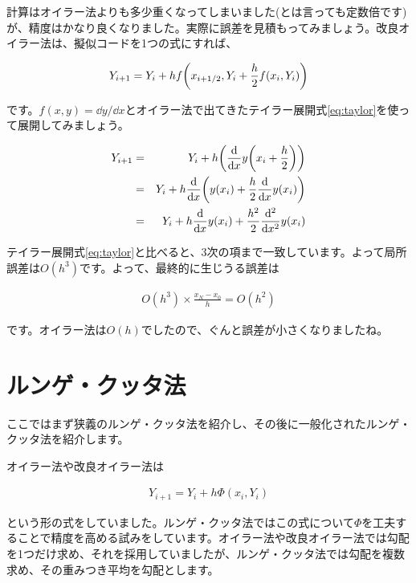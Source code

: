 計算はオイラー法よりも多少重くなってしまいました(とは言っても定数倍です)が、精度はかなり良くなりました。実際に誤差を見積もってみましょう。改良オイラー法は、擬似コードを1つの式にすれば、

\begin{eqnarray}
    Y_{i+1}=Y_i+hf\pqty{x_{i+1/2},Y_i+\frac{h}{2}f(x_i,Y_i)}
\end{eqnarray}

\noindent
です。$f(x,y)=\dd y/\dd x$とオイラー法で出てきたテイラー展開式\ref{eq:taylor}を使って展開してみましょう。

\begin{eqnarray}
    Y_{i+1}&=&Y_i+h\pqty{\frac{\dd}{\dd x}y\pqty{x_i+\frac{h}{2}}} \\
    &=&Y_i+h\frac{\dd}{\dd x}\pqty{y(x_i)+\frac{h}{2}\frac{\dd}{\dd x}y(x_i)} \nonumber \\
    &=&Y_i+h\frac{\dd}{\dd x}y(x_i)+\frac{h^2}{2}\frac{\dd^2}{\dd x^2}y(x_i) \setcounter{equation}{9}
\end{eqnarray}

テイラー展開式\ref{eq:taylor}と比べると、3次の項まで一致しています。よって局所誤差は$O(h^3)$です。よって、最終的に生じうる誤差は

\begin{eqnarray}
    O(h^3)\times \frac{x_N-x_0}{h}=O(h^2)
\end{eqnarray}

です。オイラー法は$O(h)$でしたので、ぐんと誤差が小さくなりましたね。







\section{ルンゲ・クッタ法}
\label{runge-kutta}
ここではまず狭義のルンゲ・クッタ法を紹介し、その後に一般化されたルンゲ・クッタ法を紹介します。

オイラー法や改良オイラー法は

\begin{eqnarray}
    Y_{i+1}=Y_i+h\Phi(x_i,Y_i)
\end{eqnarray}

\noindent
という形の式をしていました。ルンゲ・クッタ法ではこの式について$\Phi$を工夫することで精度を高める試みをしています。オイラー法や改良オイラー法では勾配を1つだけ求め、それを採用していましたが、ルンゲ・クッタ法では勾配を複数求め、その重みつき平均を勾配とします。


